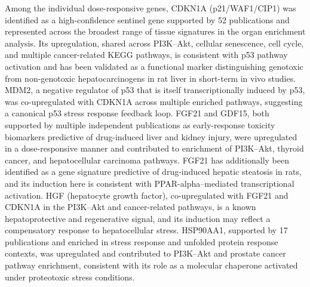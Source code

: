 Among the individual dose-responsive genes, CDKN1A (p21/WAF1/CIP1) was identified as a high-confidence sentinel gene supported by 52 publications and represented across the broadest range of tissue signatures in the organ enrichment analysis. Its upregulation, shared across PI3K–Akt, cellular senescence, cell cycle, and multiple cancer-related KEGG pathways, is consistent with p53 pathway activation and has been validated as a functional marker distinguishing genotoxic from non-genotoxic hepatocarcinogens in rat liver in short-term in vivo studies. MDM2, a negative regulator of p53 that is itself transcriptionally induced by p53, was co-upregulated with CDKN1A across multiple enriched pathways, suggesting a canonical p53 stress response feedback loop. FGF21 and GDF15, both supported by multiple independent publications as early-response toxicity biomarkers predictive of drug-induced liver and kidney injury, were upregulated in a dose-responsive manner and contributed to enrichment of PI3K–Akt, thyroid cancer, and hepatocellular carcinoma pathways. FGF21 has additionally been identified as a gene signature predictive of drug-induced hepatic steatosis in rats, and its induction here is consistent with PPAR-alpha–mediated transcriptional activation. HGF (hepatocyte growth factor), co-upregulated with FGF21 and CDKN1A in the PI3K–Akt and cancer-related pathways, is a known hepatoprotective and regenerative signal, and its induction may reflect a compensatory response to hepatocellular stress. HSP90AA1, supported by 17 publications and enriched in stress response and unfolded protein response contexts, was upregulated and contributed to PI3K–Akt and prostate cancer pathway enrichment, consistent with its role as a molecular chaperone activated under proteotoxic stress conditions.

